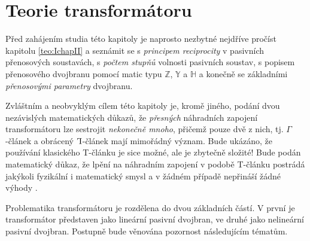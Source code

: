 {
\chapter{Teorie transformátoru}\label{ES:kap_teorie_trafa}
\minitoc

  Před zahájením studia této kapitoly je naprosto nezbytné nejdříve pročíst kapitolu 
  \ref{teo:IchapII} a seznámit se s \emph{principem reciprocity} v pasivních přenosových 
  soustavách, s \emph{počtem stupňů} volnosti pasivních soustav, s popisem přenosového dvojbranu 
  pomocí matic typu \(\mathbb{Z}\), \(\mathbb{Y}\) a \(\mathbb{H}\) a konečně se základními 
  \emph{přenosovými parametry} dvojbranu.
  
  Zvláštním a neobvyklým cílem této kapitoly je, kromě jiného, podání dvou nezávislých 
  matematických důkazů, že \emph{přesných} náhradních zapojení transformátoru lze sestrojit 
  \emph{nekonečně mnoho}, přičemž pouze dvě z nich, tj. \(\Gamma\)-článek a obrácený 
  \(\ammaG\)-článek mají mimořádný význam. Bude ukázáno, že používání klasického T-článku je sice 
  možné, ale je zbytečně složité! Bude podán matematický důkaz, že lpění na náhradním zapojení v 
  podobě T-článku postrádá jakýkoli fyzikální i matematický smysl a v žádném případě nepřináší 
  žádné výhody \cite[s.~340]{Patocka4}. 

  Problematika transformátoru je rozdělena do dvou základních částí. V první je transformátor  
  představen jako lineární pasivní dvojbran, ve druhé jako nelineární pasivní dvojbran. Postupně  
  bude věnována pozornost následujícím tématům.

}
